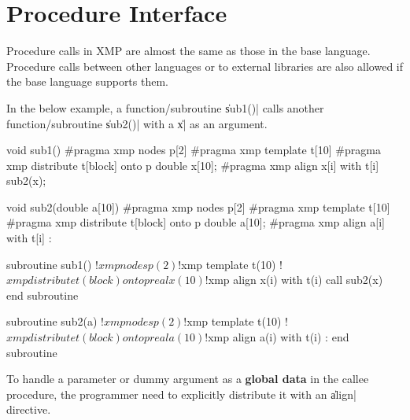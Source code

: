 \section{Procedure Interface}

Procedure calls in XMP are almost the same as those in the base language.
%
Procedure calls between other languages or to external libraries
are also allowed if the base language supports them. 

In the below example, a function/subroutine \|sub1()| calls another
function/subroutine \|sub2()| with a {\darray} \|x| as an
argument.

\begin{XCexample}
void sub1(){
#pragma xmp nodes p[2]
#pragma xmp template t[10]
#pragma xmp distribute t[block] onto p
  double x[10];
#pragma xmp align x[i] with t[i]
  sub2(x);
}

void sub2(double a[10]){
#pragma xmp nodes p[2]
#pragma xmp template t[10]
#pragma xmp distribute t[block] onto p
  double a[10];
#pragma xmp align a[i] with t[i]
  :
}
\end{XCexample}

\begin{XFexample}
subroutine sub1()
!$xmp nodes p(2)
!$xmp template t(10)
!$xmp distribute t(block) onto p
  real x(10)
!$xmp align x(i) with t(i)
  call sub2(x)
end subroutine

subroutine sub2(a)
!$xmp nodes p(2)
!$xmp template t(10)
!$xmp distribute t(block) onto p
  real a(10)
!$xmp align a(i) with t(i)
  :
end subroutine
\end{XFexample}


To handle a parameter or dummy argument as a {\bf global data} in the
callee procedure, the programmer need to explicitly distribute it with
an \|align| directive.

